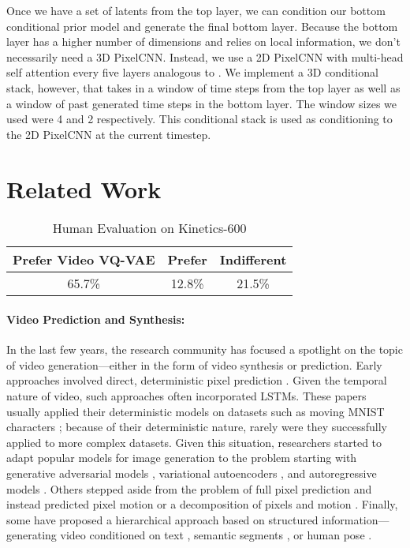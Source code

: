 \documentclass{article}
\begin{document}
Once we have a set of latents from the top layer, we can condition our bottom conditional prior model and generate the final bottom layer. Because the bottom layer has a higher number of dimensions and relies on local information, we don't necessarily need a 3D PixelCNN. Instead, we use a 2D PixelCNN with multi-head self attention every five layers analogous to \cite{RazaviOV19}. We implement a 3D conditional stack, however, that takes in a window of time steps from the top layer as well as a window of past generated time steps in the bottom layer. The window sizes we used were 4 and 2 respectively. This conditional stack is used as conditioning to the 2D PixelCNN at the current timestep.  \section{Related Work}
\begin{table}
  \caption{Human Evaluation on Kinetics-600}
  \centering
  \begin{tabular}{ccc}
    \toprule
    Prefer Video VQ-VAE & Prefer \cite{luc2020} & Indifferent  \\
    \midrule
    65.7\% & 12.8\% & 21.5\% \\
    \bottomrule
  \end{tabular}
  \label{quant_results2}
\end{table}

\paragraph{Video Prediction and Synthesis:}
In the last few years, the research community has focused a spotlight on the topic of video generation---either in the form of video synthesis or prediction. Early approaches involved direct, deterministic pixel prediction \cite{RanzatoSBMCC14, SrivastavaMS15, OhGLLS15, patraucean2015spatiotemporal}. Given the temporal nature of video, such approaches often incorporated LSTMs. These papers usually applied their deterministic models on datasets such as moving MNIST characters \cite{SrivastavaMS15}; because of their deterministic nature, rarely were they successfully applied to more complex datasets. Given this situation, researchers started to adapt popular models for image generation to the problem starting with generative adversarial models \cite{MathieuCL15, VondrickPT16, lee2018savp, babaeizadeh2018stochastic, clark2020adversarial, saito2018, luc2020, XiongL00L18}, variational autoencoders \cite{Xue0BF16}, and autoregressive models \cite{KalchbrennerOSD17, WeissenbornTU20}. Others stepped aside from the problem of full pixel prediction and instead predicted pixel motion \cite{Finn16, Walker16, JiaBTG16} or a decomposition of pixels and motion \cite{denton18a, Gao_2019_ICCV, pmlr-v80-jang18a, hao2018controllable, LiFYWLY18, Tulyakov0YK18, VillegasICLR17}. Finally, some have proposed a hierarchical approach based on structured information---generating video conditioned on text \cite{LiMSCC18}, semantic segments \cite{LucNCVL17, LucCLV18}, or human pose \cite{Walker17, VillegasICML17}.
\end{document}
